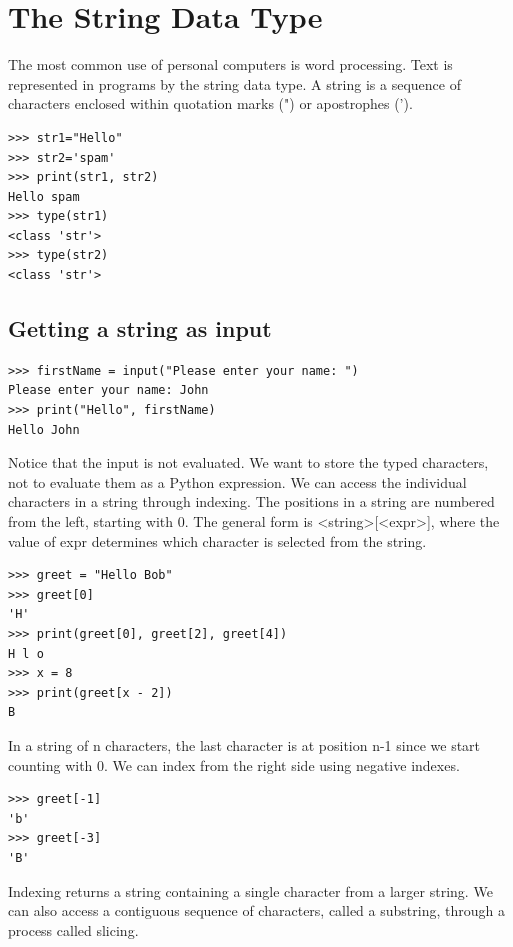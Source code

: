 \documentclass[12pt,a4paper,final,twoside,titlepage]{book}
\begin{document}
\section{The String Data Type}
The most common use of personal computers is word processing. Text is represented in programs by the string data type.
A string is a sequence of characters enclosed within quotation marks (") or apostrophes (').
\begin{lstlisting}
>>> str1="Hello"
>>> str2='spam'
>>> print(str1, str2)
Hello spam
>>> type(str1)
<class 'str'>
>>> type(str2)
<class 'str'>
\end{lstlisting}

\subsection{Getting a string as input}
\begin{lstlisting}
>>> firstName = input("Please enter your name: ")
Please enter your name: John
>>> print("Hello", firstName)
Hello John
\end{lstlisting}
Notice that the input is not evaluated. We want to store the typed characters, not to evaluate them as a Python expression. We can access the individual characters in a string through indexing. The positions in a string are numbered from the left, starting with 0. The general form is <string>[<expr>], where the value of expr determines which character is selected from the string.
\begin{lstlisting}
>>> greet = "Hello Bob"
>>> greet[0]
'H'
>>> print(greet[0], greet[2], greet[4])
H l o
>>> x = 8
>>> print(greet[x - 2])
B
\end{lstlisting}
In a string of n characters, the last character is at position n-1 since we start counting with 0. We can index from the right side using negative indexes.
\begin{lstlisting}
>>> greet[-1]
'b'
>>> greet[-3]
'B'
\end{lstlisting}
Indexing returns a string containing a single character from a larger string. We can also access a contiguous sequence of characters, called a substring, through a process called slicing.
\end{document}
